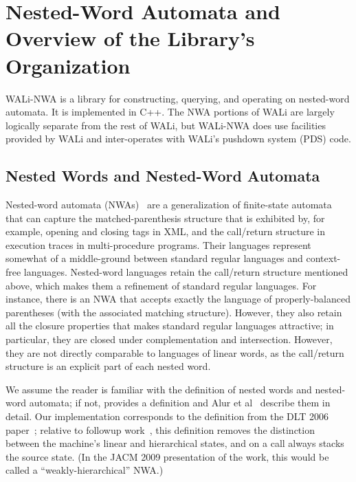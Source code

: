 \section{Nested-Word Automata and Overview of the Library's Organization}
\label{Se:Nested Word Automata}

WALi-NWA is a library for constructing, querying, and operating on
nested-word automata.  It is implemented in C++.  The NWA portions of WALi
are largely logically separate from the rest of WALi, but WALi-NWA does use
facilities provided by WALi and inter-operates with WALi's pushdown system
(PDS) code.

\subsection{Nested Words and Nested-Word Automata}

Nested-word automata (NWAs)~\cite{DLT:AM2006,JACM:AM2009} are a generalization
of finite-state automata that can capture the matched-parenthesis structure
that is exhibited by, for example, opening and closing tags in XML, and the
call/return structure in execution traces in multi-procedure
programs. Their languages represent somewhat of a middle-ground between
standard regular languages and context-free languages. Nested-word languages
retain the call/return structure mentioned above, which makes them a
refinement of standard regular languages. For instance, there is an NWA that
accepts exactly the language of properly-balanced parentheses (with the
associated matching structure). However, they also retain all the closure
properties that makes standard regular languages attractive; in particular,
they are closed under complementation and intersection. However, they are not
directly comparable to languages of linear words, as the call/return
structure is an explicit part of each nested word.

We assume the reader is familiar with the definition of nested words and
nested-word automata; if not,  provides a definition and
Alur et al~\cite{DLT:AM2006,JACM:AM2009} describe them in detail. Our
implementation corresponds to the definition from the DLT 2006
paper~\cite{DLT:AM2006}; relative to followup work~\cite{JACM:AM2009}, this definition removes
the distinction between the machine's linear and hierarchical states, and on
a call always stacks the source state. (In the JACM 2009 presentation of the
work, this would be called a ``weakly-hierarchical'' NWA.)

